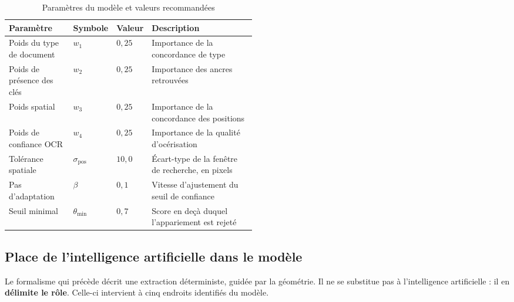 \begin{table}[H]
    \centering
    \caption{Paramètres du modèle et valeurs recommandées}
    \label{tab:parametres}
    \begin{tabularx}{\linewidth}{|p{0.26\linewidth}|p{0.10\linewidth}|p{0.13\linewidth}|X|}
        \hline
        \rowcolor[HTML]{FFCCCC}
        \textbf{Paramètre} & \textbf{Symbole} & \textbf{Valeur} & \textbf{Description} \\
        \hline
        Poids du type de document & $w_1$ & $0{,}25$ & Importance de la concordance de type \\
        \hline
        Poids de présence des clés & $w_2$ & $0{,}25$ & Importance des ancres retrouvées \\
        \hline
        Poids spatial & $w_3$ & $0{,}25$ & Importance de la concordance des positions \\
        \hline
        Poids de confiance OCR & $w_4$ & $0{,}25$ & Importance de la qualité d'océrisation \\
        \hline
        Tolérance spatiale & $\sigma_{\text{pos}}$ & $10{,}0$ & Écart-type de la fenêtre de recherche, en pixels \\
        \hline
        Pas d'adaptation & $\beta$ & $0{,}1$ & Vitesse d'ajustement du seuil de confiance \\
        \hline
        Seuil minimal & $\theta_{\min}$ & $0{,}7$ & Score en deçà duquel l'appariement est rejeté \\
        \hline
    \end{tabularx}
\end{table}

\subsection{Place de l'intelligence artificielle dans le modèle}
\label{subsec:place-ia}

Le formalisme qui précède décrit une extraction déterministe, guidée par la géométrie. Il ne
se substitue pas à l'intelligence artificielle : il en \textbf{délimite le rôle}. Celle-ci
intervient à cinq endroits identifiés du modèle.

